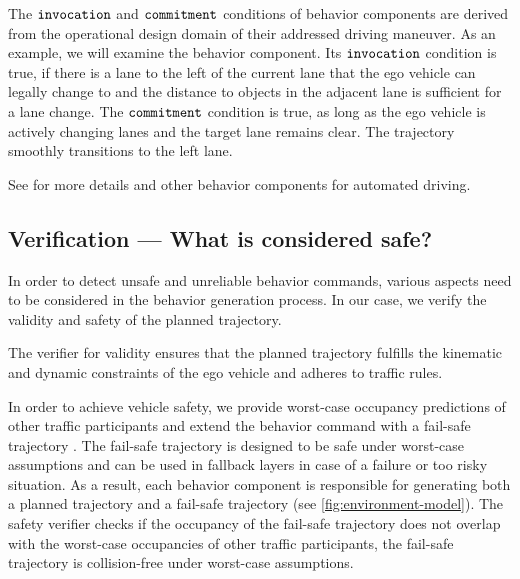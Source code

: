 The $\texttt{invocation}$ and $\texttt{commitment}$ conditions of behavior components are derived from the operational design domain of their addressed driving maneuver.
%
As an example, we will examine the  behavior component.
Its $\texttt{invocation}$ condition is true,
if there is a lane to the left of the current lane that the ego vehicle can legally change to and the distance to objects in the adjacent lane is sufficient for a lane change.
The $\texttt{commitment}$ condition is true, as long as the ego vehicle is actively changing lanes
and the target lane remains clear.
The trajectory smoothly transitions to the left lane.

See \cite{orzechowskiVerhaltensentscheidungFuerAutomatisierte2023} for more details and other behavior components for automated driving.






\subsection{Verification --- What is considered \textbf{safe}?}

In order to detect unsafe and unreliable behavior commands,
various aspects need to be considered in the behavior generation process.
%
In our case, we verify the validity and safety of the planned trajectory.

The verifier for validity ensures that the planned trajectory fulfills the kinematic and dynamic constraints of the ego vehicle
and adheres to traffic rules.

In order to achieve vehicle safety, we
provide worst-case occupancy predictions of other traffic participants
and extend the behavior command with a fail-safe trajectory \cite{althoffSetBasedPredictionTraffic2016}.
The fail-safe trajectory is designed to be safe under worst-case assumptions
and can be used in fallback layers in case of a failure or too risky situation.
As a result, each behavior component is responsible for generating both
a planned trajectory and a fail-safe trajectory (see \cref{fig:environment-model}).
The safety verifier checks if the occupancy of the fail-safe trajectory does not overlap
with the worst-case occupancies of other traffic participants,
\ie the fail-safe trajectory is collision-free under worst-case assumptions.



